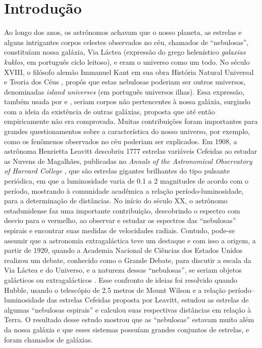 \chapter{Introdução}
\label{chap:intro}

Ao longo dos anos, os astrônomos achavam que o nosso planeta, as estrelas e alguns intrigantes corpos celestes observados no céu, chamados de ``nebulosas'', constituíam nossa galáxia, Via Láctea (expressão do grego helenístico \emph{galaxias kuklos}, em português ciclo leitoso), e eram o universo como um todo. No século XVIII, o filósofo alemão Immanuel Kant em sua obra História Natural Universal e Teoria dos Céus \cite{1755Kant}, propôs que estas nebulosas poderiam ser outros universos, denominadas \emph{island universes} (em português universos ilhas). Essa expressão, também usada por  e , seriam corpos não pertencentes à nossa galáxia, surgindo com a ideia da existência de outras galáxias, proposta que até então empiricamente não era comprovada. Muitas contribuições foram importantes para grandes questionamentos sobre a característica do nosso universo, por exemplo, como os fenômenos observados no céu poderiam ser explicados. Em 1908, a astrônoma Henrietta Leavitt descobriu 1777 estrelas variáveis Cefeidas ao estudar as Nuvens de Magalhães, publicadas no \emph{Annals of the Astronomical Observatory of Harvard College} \cite{1908Leavitt}, que são estrelas gigantes brilhantes do tipo pulsante periódica, em que a luminosidade varia de 0.1 a 2 magnitudes de acordo com o período, mostrando à comunidade acadêmica a relação período-luminosidade, para a determinação de distâncias. No início do século XX, o astrônomo estadunidense  faz uma importante contribuição, descobrindo o espectro com desvio para o vermelho, ao observar e estudar os espectros das ``nebulosas'' espirais e encontrar suas medidas de velocidades radiais. Contudo, pode-se assumir que a astronomia extragaláctica teve um destaque e com isso a origem, a partir de 1920, quando a Academia Nacional de Ciências dos Estados Unidos realizou um debate, conhecido como o Grande Debate, para discutir a escala da Via Láctea e do Universo, e a natureza dessas ``nebulosas'', se seriam objetos galácticos ou extragalácticos \cite{2022gastao}. Esse confronto de ideias foi resolvido quando Hubble, usando o telescópio de 2.5 metros de Mount Wilson e a relação período–luminosidade das estrelas Cefeidas proposta por Leavitt, estudou as estrelas de algumas ``nebulosas espirais'' e calculou suas respectivas distâncias em relação à Terra. O resultado desse estudo \cite{2018inpe} mostrou que as ``nebulosas'' estavam muito além da nossa galáxia e que esses sistemas possuíam grandes conjuntos de estrelas, e foram chamados de galáxias.

